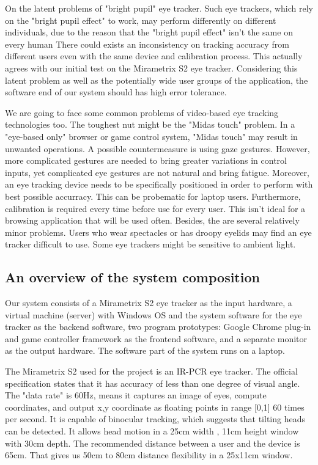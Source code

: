 \documentclass[english]{tktltiki}
\begin{document}
On the latent problems of "bright pupil" eye tracker. Such eye trackers, which rely on the "bright pupil effect" to work, may perform differently on different individuals, due to the reason that the "bright pupil effect" isn't the same on every human \cite{Nguyen:2002:DIB:507072.507099} There could exists an inconsistency on tracking accuracy from different users even with the same device and calibration process. This actually agrees with our initial test on the Mirametrix S2 eye tracker. Considering this latent problem as well as the potentially wide user groups of the application, the software end of our system should has high error tolerance.

We are going to face some common problems of video-based eye tracking technologies too. The toughest nut might be the "Midas touch" problem.\cite{Velichkovsky97} In a "eye-based only" browser or game control system, "Midas touch" may result in unwanted operations. A possible countermeasure is using gaze gestures. \cite{Ohno:1998:FEG:786112.786297} However, more complicated gestures are needed to bring greater variations in control inputs, yet complicated eye gestures are not natural and bring fatigue. Moreover, an eye tracking device needs to be specifically positioned in order to perform with best possible accurracy. This can be probematic for laptop users.  Furthermore, calibration is required every time before use for every user. This isn't ideal for a browsing application that will be used often. Besides, the are several relatively minor problems. Users who wear spectacles or has droopy eyelids may find an eye tracker difficult to use. Some eye trackers might be sensitive to ambient light. 

\subsection{An overview of the system composition}

Our system consists of a Mirametrix S2 eye tracker as the input hardware, a virtual machine (server) with Windows OS and the system software for the eye tracker as the backend software, two program prototypes: Google Chrome plug-in and game controller framework as the frontend software, and a separate monitor as the output hardware. The software part of the system runs on a laptop.

The Mirametrix S2 used for the project is an IR-PCR eye tracker. The official specification states that it has accuracy of less than one degree of visual angle. The "data rate" is 60Hz, means it captures an image of eyes, compute coordinates, and output x,y coordinate as floating points in range [0,1] 60 times per second. It is capable of binocular tracking, which suggests that tilting heads can be detected. It allows head motion in a 25cm width , 11cm height window with 30cm depth. The recommended distance between a user and the device is 65cm. That gives us 50cm to 80cm distance flexibility in a 25x11cm window. 
\end{document}
